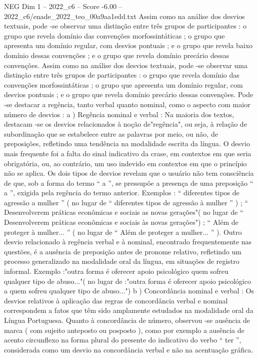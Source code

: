 \begin{textsample}{NEG Dim 1 – 2022\_c6 – Score -6.00 – 2022\_c6/enade\_2022\_teo\_00a9aa1edd.txt}
Assim como na análise dos desvios textuais, pode -se observar uma distinção entre três grupos de participantes : o grupo que revela domínio das convenções morfossintáticas ; o grupo que apresenta um domínio regular, com desvios pontuais ; e o grupo que revela baixo domínio dessas convenções ; e o grupo que revela domínio precário dessas convenções.
Assim como na análise dos desvios textuais, pode -se observar uma distinção entre três grupos de participantes : o grupo que revela domínio das convenções morfossintáticas ; o grupo que apresenta um domínio regular, com desvios pontuais ; e o grupo que revela domínio precário dessas convenções.
Pode -se destacar a regência, tanto verbal quanto nominal, como o aspecto com maior número de desvios : a ) Regência nominal e verbal : Na maioria dos textos, destacam -se os desvios relacionados à noção de"regência", ou seja, à relação de subordinação que se estabelece entre as palavras por meio, ou não, de preposições, refletindo uma tendência na modalidade escrita da língua.
O desvio mais frequente foi a falta do sinal indicativo da crase, em contextos em que seria obrigatória, ou, ao contrário, um uso indevido em contextos em que o princípio não se aplica.
Os dois tipos de desvios revelam que o usuário não tem consciência de que, sob a forma do termo “ a ”, se pressupõe a presença de uma preposição “ a ”, exigida pela regência do termo anterior.
Exemplos : “ diferentes tipos de agressão a mulher ” ( no lugar de “ diferentes tipos de agressão à mulher ” ) ; “ Desenvolverem práticas econômicas e sociais as novas gerações"( no lugar de “ Desenvolverem práticas econômicas e sociais às novas gerações") ; “ Além de proteger à mulher... ” ( no lugar de “ Além de proteger a mulher... ” ).
Outro desvio relacionado à regência verbal e à nominal, encontrado frequentemente nas questões, é a ausência de preposição antes de pronome relativo, refletindo um processo generalizado na modalidade oral da língua, em situações de registro informal.
Exemplo :"outra forma é oferecer apoio psicológico quem sofreu qualquer tipo de abuso..."( no lugar de :"outra forma é oferecer apoio psicológico a quem sofreu qualquer tipo de abuso...") b ) Concordância nominal e verbal : Os desvios relativos à aplicação das regras de concordância verbal e nominal correspondem a fatos que têm sido amplamente estudados na modalidade oral da Língua Portuguesa.
Quanto à concordância de número, observou -se ausência de marca ( com sujeito anteposto ou posposto ), como por exemplo a ausência de acento circunflexo na forma plural do presente do indicativo do verbo “ ter ”, considerada como um desvio na concordância verbal e não na acentuação gráfica.

\end{textsample}
